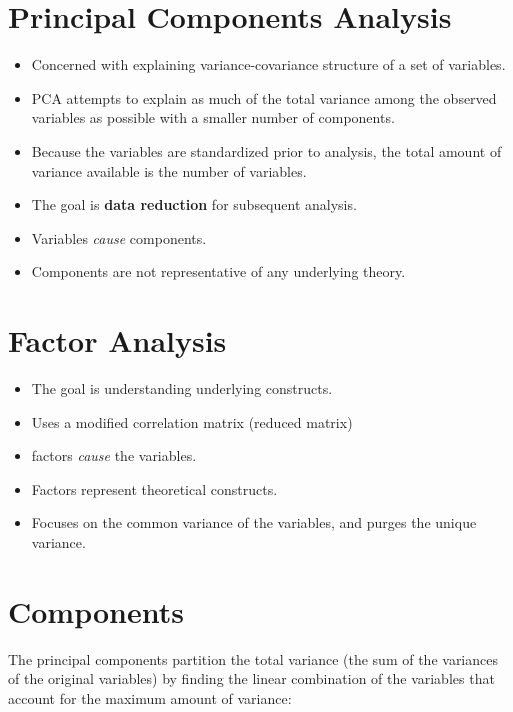 \documentclass[
]{book}
\providecommand{\tightlist}{%
  \setlength{\itemsep}{0pt}\setlength{\parskip}{0pt}}
\begin{document}
\hypertarget{principal-components-analysis}{%
\section{Principal Components Analysis}\label{principal-components-analysis}}

\begin{itemize}
\tightlist
\item
  Concerned with explaining variance-covariance structure of a set of variables.
\item
  PCA attempts to explain as much of the total variance among the observed variables as possible with a smaller number of components.
\item
  Because the variables are standardized prior to analysis, the total amount of variance available is the number of variables.
\item
  The goal is \textbf{data reduction} for subsequent analysis.
\item
  Variables \emph{cause} components.
\item
  Components are not representative of any underlying theory.
\end{itemize}

\hypertarget{factor-analysis-1}{%
\section{Factor Analysis}\label{factor-analysis-1}}

\begin{itemize}
\tightlist
\item
  The goal is understanding underlying constructs.
\item
  Uses a modified correlation matrix (reduced matrix)
\item
  factors \emph{cause} the variables.
\item
  Factors represent theoretical constructs.
\item
  Focuses on the common variance of the variables, and purges the unique variance.
\end{itemize}

\hypertarget{components}{%
\section{Components}\label{components}}

The principal components partition the total variance (the sum of the variances of the original variables) by finding the linear combination of the variables that account for the maximum amount of variance:
\end{document}

